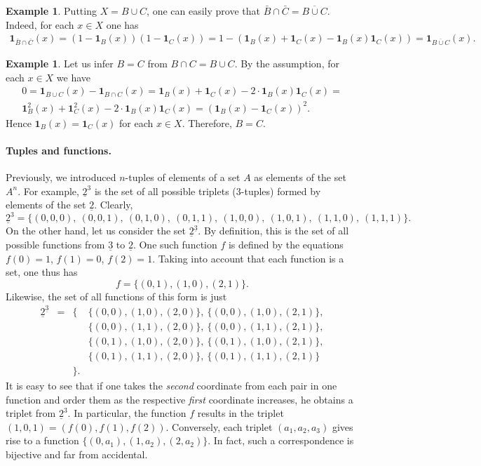 \documentclass[12pt,notitlepage]{article}
\theoremstyle{plain}
\theoremstyle{definition}
\newtheorem{exm}[thm]{Example}
\theoremstyle{plain}
\newcommand{\ul}[1]{\underline{#1}}
\newcommand{\1}{\mathbf{1}}
\newcommand{\0}{\mathbf{0}}
\begin{document}
\begin{exm} Putting $X = B \cup C$, one can easily prove that $\bar B \cap \bar C = \overline{B \cup C}$.  Indeed, for each $x \in X$ one has
\begin{multline*}
\1_{\bar B \cap \bar C}(x) = (1 - \1_B(x))(1 - \1_C(x)) =
1 - (\1_B(x) + \1_C(x) - \1_B(x) \1_C(x)) = \1_{\overline{B \cup C}}(x).
\end{multline*}
\end{exm}

\begin{exm}
Let us infer $B = C$ from $B \cap C = B \cup C$. By the assumption, for each $x \in X$ we have
\begin{multline*}
0 = \1_{B \cup C}(x) - \1_{B \cap C}(x) = \1_B(x) + \1_C(x) - 2\cdot\1_B(x)\1_C(x) =\\
  \1^2_B(x) + \1^2_C(x) - 2\cdot\1_B(x)\1_C(x) = (\1_B(x) - \1_C(x))^2.
\end{multline*}
Hence $\1_B(x) = \1_C(x)$ for each $x \in X$. Therefore, $B = C$.
\end{exm}

\paragraph{Tuples and functions.} Previously, we introduced $n$-tuples of elements of a set $A$ as elements of the set $A^n$. For example, $\ul{2}^{3}$ is the set of all possible triplets ($3$-tuples) formed by elements of the set $\ul{2}$. Clearly,
$$
\ul{2}^3 = \{(0,0,0),\ (0,0,1),\ (0, 1, 0),\ (0, 1, 1),\ (1,0,0),\ (1,0,1),\ (1, 1, 0),\ (1, 1, 1)\}.
$$
On the other hand, let us consider the set $\ul{2}^{\ul{3}}$. By definition, this is the set of all possible functions from $\ul{3}$ to $\ul{2}$. One such function $f$ is defined by the equations $f(0) = 1$, $f(1) = 0$, $f(2) = 1$. Taking into account that each function is a set, one thus has
$$f = \{ (0,1), (1,0), (2,1) \}.$$
Likewise, the set of all functions of this form is just
$$
\begin{array}{rcll}
\ul{2}^{\ul{3}} &=& \{& \{(0,0), (1,0), (2,0)\},\ \{(0,0), (1,0), (2,1)\},\\
					&&& \{(0,0), (1,1), (2,0)\},\ \{(0,0), (1,1), (2,1)\},\\
					&&& \{(0,1), (1,0), (2,0)\},\ \{(0,1), (1,0), (2,1)\},\\
					&&& \{(0,1), (1,1), (2,0)\},\ \{(0,1), (1,1), (2,1)\}\\
					&& \}. &
\end{array}
$$
It is easy to see that if one takes the \emph{second} coordinate from each pair in one function and order them as the respective \emph{first} coordinate increases, he obtains a triplet from $\ul{2}^3$. In particular, the function $f$ results in the triplet $(1, 0, 1) = (f(0), f(1), f(2))$. Conversely, each triplet $(a_1, a_2, a_3)$ gives rise to a function $\{(0,a_1), (1, a_2), (2, a_2)\}$. In fact, such a correspondence is bijective and far from accidental.
\end{document}
